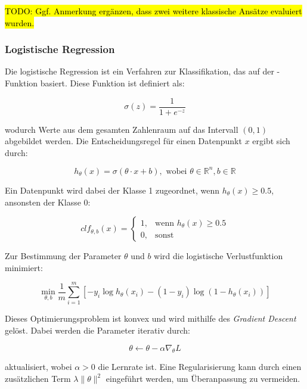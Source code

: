 \documentclass[researchlab,group,]{AIGpaper}
\newcommand{\redhl}{\sethlcolor{red}\hl}
\begin{document}
\redhl{TODO: Ggf. Anmerkung ergänzen, dass zwei weitere klassische Ansätze evaluiert wurden.}

\subsubsection{Logistische Regression}

Die logistische Regression ist ein Verfahren zur Klassifikation, das auf der \Sigmoid-Funktion basiert. Diese Funktion ist definiert als:

\begin{equation*}
    \sigma(z) = \frac{1}{1 + e^{-z}}
\end{equation*}

wodurch Werte aus dem gesamten Zahlenraum auf das Intervall $(0,1)$ abgebildet werden. Die Entscheidungsregel für einen Datenpunkt $x$ ergibt sich durch:

\begin{equation*}
    h_{\theta}(x) = \sigma(\theta \cdot x + b), \text{ wobei } \theta \in \mathbb{R}^{n}, b \in \mathbb{R}
\end{equation*}

Ein Datenpunkt wird dabei der Klasse 1 zugeordnet, wenn $h_{\theta}(x) \geq 0.5$, ansonsten der Klasse 0:

\begin{equation*}
    clf_{\theta, b}(x) =
    \begin{cases}
        1, & \text{wenn } h_{\theta}(x) \geq 0.5 \\
        0, & \text{sonst}
    \end{cases}
\end{equation*}

Zur Bestimmung der Parameter $\theta$ und $b$ wird die logistische Verlustfunktion minimiert:

\begin{equation*}
    \min_{\theta, b} \frac{1}{m} \sum_{i=1}^{m} \left[-y_i \log h_{\theta}(x_i) - (1 - y_i) \log(1 - h_{\theta}(x_i))\right]
\end{equation*}

Dieses Optimierungsproblem ist konvex und wird mithilfe des \textit{Gradient Descent} gelöst. Dabei werden die Parameter iterativ durch:

\begin{equation*}
    \theta \leftarrow \theta - \alpha \nabla_{\theta} L
\end{equation*}

aktualisiert, wobei $\alpha > 0$ die Lernrate ist. Eine Regularisierung kann durch einen zusätzlichen Term $\lambda \lVert\theta\rVert^2$ eingeführt werden, um Überanpassung zu vermeiden.
\end{document}
